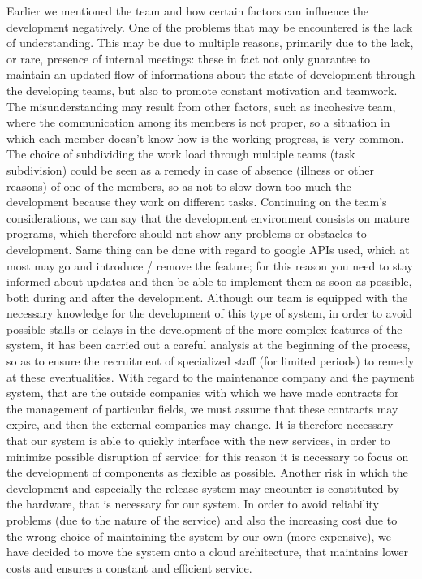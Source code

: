 \documentclass[10pt, a4paper,titlepage]{article}
\begin{document}
Earlier we mentioned the team and how certain factors can influence the development negatively.
One of the problems that may be encountered is the lack of understanding. This may be due to multiple reasons, primarily due to the lack, or rare, presence of internal meetings: these in fact not only guarantee to maintain an updated flow of informations about the state of development through the developing teams, but also to promote constant motivation and teamwork.
The misunderstanding may result from other factors, such as incohesive team, where the communication among its members is not proper, so a situation in which each member doesn’t know how is the working progress, is very common.
The choice of subdividing the work load through multiple teams (task subdivision) could be seen as a remedy in case of absence (illness or other reasons) of one of the members, so as not to slow down too much the development because they work on different tasks.
Continuing on the team's considerations, we can say that the development environment consists on mature programs, which therefore should not show any problems or obstacles to development. Same thing can be done with regard to google APIs used, which at most may go and introduce / remove the feature; for this reason you need to stay informed about updates and then be able to implement them as soon as possible, both during and after the development.
Although our team is equipped with the necessary knowledge for the development of this type of system, in order to avoid possible stalls or delays in the development of the more complex features of the system, it has been carried out a careful analysis at the beginning of the process, so as to ensure the recruitment of specialized staff (for limited periods) to remedy at these eventualities.
With regard to the maintenance company and the payment system, that are the outside companies with which we have made contracts for the management of particular fields, we must assume that these contracts may expire, and then the external companies may change. It is therefore necessary that our system is able to quickly interface with the new services, in order to minimize possible disruption of service: for this reason it is necessary to focus on the development of components as flexible as possible.
Another risk in which the development and especially the release system may encounter is constituted by the hardware, that is necessary for our system. 
In order to avoid reliability problems (due to the nature of the service) and also the increasing cost due to the wrong choice of maintaining the system by our own (more expensive), we have decided to move the system onto a cloud architecture, that maintains lower costs and ensures a constant and efficient service.
\end{document}
